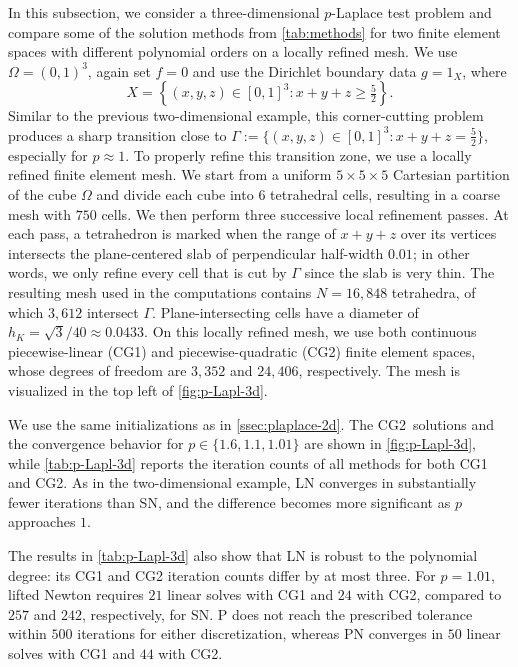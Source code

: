 \documentclass[11pt,pdflatex,sn-mathphys-num]{sn-jnl}
\theoremstyle{thmstyleone}%
\theoremstyle{thmstyletwo}%
\theoremstyle{thmstylethree}%
\begin{document}
In this subsection, we consider a three-dimensional $p$-Laplace test problem and compare some of the solution methods from \cref{tab:methods} for two finite element spaces with different polynomial orders on a locally refined mesh.  We use $\Omega=(0,1)^3$, again set $f=0$ and use the Dirichlet boundary data $g=1_{X}$, where
\begin{equation*}
    X=\left\{(x,y,z)\in [0,1]^3: x+y+z\geq \tfrac{5}{2}\right\}.
\end{equation*}
Similar to the previous two-dimensional example, this corner-cutting problem produces a sharp transition close to
$
    \Gamma:=\bigl\{(x,y,z)\in[0,1]^3:x+y+z=\frac{5}{2}\bigr\}
$,
especially for $p\approx1$. To properly refine this transition zone, we use a locally refined finite element mesh. We start from a uniform $5\times5\times5$ Cartesian partition of the cube $\Omega$ and divide each cube into $6$ tetrahedral cells, resulting in a coarse mesh with $750$ cells. We then perform three successive local refinement passes. At each pass, a tetrahedron is marked when the range of $x+y+z$ over its vertices intersects the plane-centered slab of perpendicular half-width $0.01$; in other words, we only refine every cell that is cut by $\Gamma$ since the slab is very thin. The resulting mesh used in the computations contains $N=16{,}848$ tetrahedra, of which $3{,}612$ intersect $\Gamma$. Plane-intersecting cells have a diameter of $h_K=\sqrt{3}/40\approx0.0433$. On this locally refined mesh, we use both continuous piecewise-linear (CG1) and piecewise-quadratic (CG2) finite element spaces, whose degrees of freedom are $3{,}352$ and $24{,}406$, respectively. The mesh is visualized in the top left of \cref{fig:p-Lapl-3d}.

We use the same initializations %
as in \cref{ssec:plaplace-2d}. The CG2~solutions and the convergence behavior for $p\in\{1.6,1.1,1.01\}$ are shown in \cref{fig:p-Lapl-3d}, while \cref{tab:p-Lapl-3d} reports the iteration counts of all methods for both CG1 and CG2. As in the two-dimensional example, LN converges in substantially fewer iterations than SN, and the difference becomes more significant as $p$ approaches $1$.

The results in \cref{tab:p-Lapl-3d} also show that LN is robust to the polynomial degree: its CG1 and CG2 iteration counts differ by at most three. For $p=1.01$, lifted Newton requires $21$ linear solves with CG1 and $24$ with CG2, compared to $257$ and $242$, respectively, for SN. P does not reach the prescribed tolerance within $500$ iterations for either discretization, whereas PN converges in $50$ linear solves with CG1 and $44$ with CG2.
\end{document}
